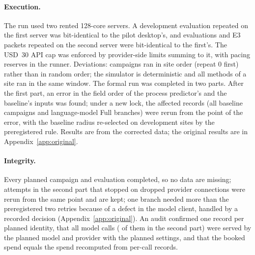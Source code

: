 \paragraph{Execution.} The run used two rented 128-core servers. A development evaluation repeated on the first server was bit-identical to the pilot desktop's, and evaluations and E3 packets repeated on the second server were bit-identical to the first's. The USD~30 API cap was enforced by provider-side limits summing to it, with pacing reserves in the runner. Deviations: campaigns ran in site order (repeat 0 first) rather than in random order; the simulator is deterministic and all methods of a site ran in the same window. The formal run was completed in two parts. After the first part, an error in the field order of the process predictor's and the baseline's inputs was found; under a new lock, the affected records (all baseline campaigns and  language-model Full branches) were rerun from the point of the error, with the baseline radius re-selected on development sites by the preregistered rule. Results are from the corrected data; the original results are in Appendix~\ref{app:original}.

\paragraph{Integrity.} Every planned campaign and evaluation completed, so no data are missing;  attempts in the second part that stopped on dropped provider connections were rerun from the same point and are kept; one branch needed more than the preregistered two retries because of a defect in the model client, handled by a recorded decision (Appendix~\ref{app:original}). An audit confirmed one record per planned identity, that all  model calls ( of them in the second part) were served by the planned model and provider with the planned settings, and that the booked spend equals the spend recomputed from per-call records.
